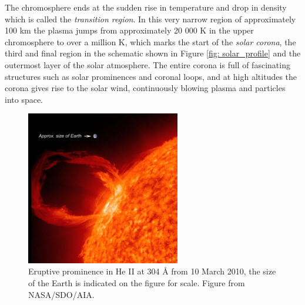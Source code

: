 The chromosphere ends at the sudden rise in temperature and drop in density which is called the
\emph{transition region}. In this very narrow region of approximately 100 km the plasma jumps from approximately 20 000 K in the upper chromosphere to over a million K, which marks the start of the \emph{solar corona}, the third and final region in the schematic shown in Figure \ref{fig: solar_profile} and the outermost layer of the solar atmosphere. The entire corona is full of fascinating structures such as solar prominences and coronal loops, and at high altitudes the corona gives rise to the solar wind, continuously blowing plasma and particles into space.

\begin{figure}[t]
  \centering
  \includegraphics[width=0.6\textwidth]{solar_prominence.png}
  \caption{
    Eruptive prominence in He II at 304 {\AA} from 10 March 2010, the size of the Earth is indicated on the figure for scale. Figure from NASA/SDO/AIA.
  }
  \label{fig: solar_prominence}
\end{figure}

